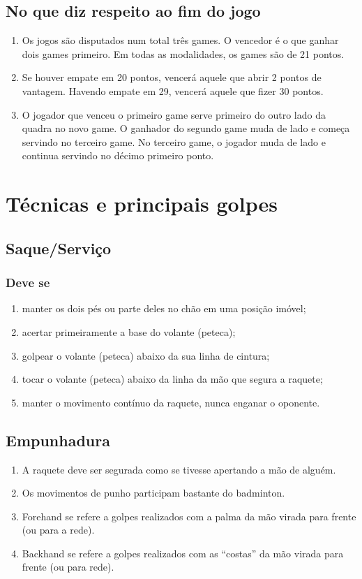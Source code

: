 \documentclass[
	article,			%
	11pt,				%
	oneside,			%
	a4paper,			%
	english,			%
	brazil,				%
	sumario=tradicional
	]{abntex2}
\begin{document}
\subsection{No que diz respeito ao fim do jogo}
\begin{enumerate}
	\item Os jogos são disputados num total três games. O vencedor é o que ganhar dois games primeiro. Em todas as modalidades, os games são de 21 pontos. 
	\item Se houver empate em 20 pontos, vencerá aquele que abrir 2 pontos de vantagem. Havendo empate em 29, vencerá aquele que fizer 30 pontos. 
	\item O jogador que venceu o primeiro game serve primeiro do outro lado da quadra no novo game. O ganhador do segundo game muda de lado e começa servindo no terceiro game. No terceiro game, o jogador muda de lado e continua servindo no décimo primeiro ponto. 
\end{enumerate}

\section{Técnicas e principais golpes}
\subsection{Saque/Serviço}
\subsubsection{Deve se}
\begin{enumerate}
	\item manter os dois pés ou parte deles no chão em uma posição imóvel;
	\item acertar primeiramente a base do volante (peteca);
	\item golpear o volante (peteca) abaixo da sua linha de cintura;
	\item tocar o volante (peteca) abaixo da linha da mão que segura a raquete;
	\item manter o movimento contínuo da raquete, nunca enganar o oponente.
\end{enumerate}

\subsection{Empunhadura}
\begin{enumerate}
	\item A raquete deve ser segurada como se tivesse apertando a mão de alguém.
	\item Os movimentos de punho participam bastante do badminton.
	\item Forehand se refere a golpes realizados com a palma da mão virada para frente (ou para a rede).
	\item Backhand se refere a golpes realizados com as ``costas'' da mão virada para frente (ou para rede).
\end{enumerate}
\end{document}

